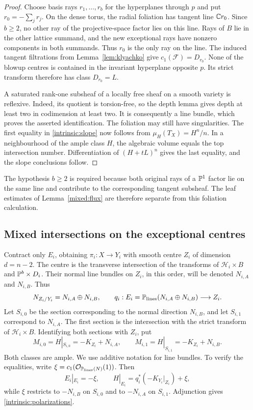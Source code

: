 \begin{proof}
Choose basis rays $r_1,\ldots,r_b$ for the hyperplanes through $p$
and put $r_0=-\sum_jr_j$. On the dense torus, the radial foliation
has tangent line $\mathbb{C} r_0$. Since $b\ge2$, no other ray of the
projective-space factor lies on this line. Rays of $B$ lie in the
other lattice summand, and the new exceptional rays have nonzero
components in both summands. Thus $r_0$ is the only ray on the line.
The induced tangent filtrations from Lemma~\ref{lem:klyachko} give
$c_1(\mathcal F)=D_{r_0}$. None of the blowup centres is contained in the invariant hyperplane
opposite $p$. Its strict transform therefore has class $D_{r_0}=L$.

A saturated rank-one subsheaf of a locally free sheaf on a smooth
variety is reflexive. Indeed, its quotient is torsion-free, so the
depth lemma gives depth at least two in codimension at least two.
It is consequently a line bundle, which proves the asserted
identification. The foliation may still have singularities.
The first equality in \eqref{intrinsic:slope} now follows from
$\mu_H(T_X)=H^n/n$. In a neighbourhood of the ample class $H$, the algebraic volume equals
the top intersection number. Differentiation of $(H+tL)^n$ gives the
last equality, and the slope conclusions follow.
\end{proof}

The hypothesis $b\ge2$ is required because both original rays of a
$\mathbb{P}^1$ factor lie on the same line and contribute to the corresponding
tangent subsheaf. The leaf estimates of Lemma~\ref{mixed:flux} are
therefore separate from this foliation calculation.

\subsection{Mixed intersections on the exceptional centres}

Contract only $E_i$, obtaining $\pi_i:X\to Y_i$ with smooth centre
$Z_i$ of dimension $d=n-2$. The centre is the transverse intersection
of the transforms of $\mathcal H_i\times B$ and $\mathbb{P}^b\times D_i$.
Their normal line bundles on $Z_i$, in this order, will be denoted
$N_{i,A}$ and $N_{i,B}$. Thus
\[
 N_{Z_i/Y_i}=N_{i,A}\oplus N_{i,B},\qquad
 q_i:E_i=\mathbb{P}_{\rm lines}(N_{i,A}\oplus N_{i,B})\longrightarrow Z_i.
\]
Let $S_{i,0}$ be the section corresponding to the normal direction
$N_{i,B}$, and let $S_{i,1}$ correspond to $N_{i,A}$. The first section is the intersection with the strict transform of
$\mathcal H_i\times B$. Identifying both sections with $Z_i$, put
\begin{equation}\label{intrinsic:polarizations}
 M_{i,0}=H|_{S_{i,0}}=-K_{Z_i}+N_{i,A},\qquad
 M_{i,1}=H|_{S_{i,1}}=-K_{Z_i}+N_{i,B}.
\end{equation}
Both classes are ample. We use additive notation for line bundles.
To verify the equalities, write
$\xi=c_1(\mathcal O_{\mathbb{P}_{\rm lines}(N)}(1))$. Then
\[
 E_i|_{E_i}=-\xi,\qquad
 H|_{E_i}=q_i^*(-K_{Y_i}|_{Z_i})+\xi,
\]
while $\xi$ restricts to $-N_{i,B}$ on $S_{i,0}$ and to $-N_{i,A}$
on $S_{i,1}$. Adjunction gives \eqref{intrinsic:polarizations}.

